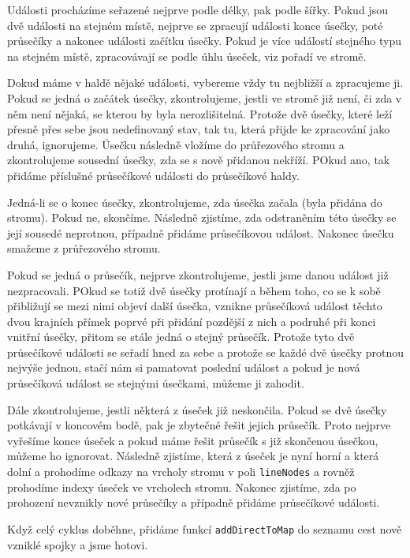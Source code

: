 Události procházíme seřazené nejprve podle délky, pak podle šířky. Pokud jsou
dvě události na stejném místě, nejprve se zpracují události konce úsečky, poté
průsečíky a nakonec události začítku úsečky. Pokud je více událostí stejného
typu na stejném místě, zpracovávají se podle úhlu úseček, viz pořadí ve stromě. 

Dokud máme v haldě nějaké události, vybereme vždy tu nejbližší a zpracujeme ji.
Pokud se jedná o začátek úsečky, zkontrolujeme, jestli ve stromě již není, či
zda v něm není nějaká, se kterou by byla nerozlišitelná. Protože dvě úsečky,
které leží přesně přes sebe jsou nedefinovaný stav, tak tu, která přijde ke
zpracování jako druhá, ignorujeme. Úsečku následně vložíme do průřezového stromu
a zkontrolujeme sousední úsečky, zda se s nově přidanou nekříží. POkud ano, tak
přidáme příslušné průsečíkové události do průsečíkové haldy.

Jedná-li se o konec úsečky, zkontrolujeme, zda úsečka začala (byla přidána do
stromu). Pokud ne, skončíme. Následně zjistíme, zda odstraněním této úsečky se
její sousedé neprotnou, případně přidáme průsečíkovou událost. Nakonec úsečku
smažeme z průřezového stromu.

Pokud se jedná o průsečík, nejprve zkontrolujeme, jestli jsme danou událost již
nezpracovali. POkud se totiž dvě úsečky protínají a během toho, co se k sobě
přibližují se mezi nimi objeví další úsečka, vznikne průsečíková událost těchto
dvou krajních přímek poprvé při přidání pozdější z nich a podruhé při konci
vnitřní úsečky, přitom se stále jedná o stejný průsečík. Protože tyto dvě
průsečíkové události se seřadí hned za sebe a protože se každé dvě úsečky
protnou nejvýše jednou, stačí nám si pamatovat poslední událost a pokud je nová
průsečíková událost se stejnými úsečkami, můžeme ji zahodit.

Dále zkontrolujeme, jestli některá z úseček již neskončila. Pokud se dvě úsečky
potkávají v koncovém bodě, pak je zbytečné řešit jejich průsečík. Proto nejprve
vyřešíme konce úseček a pokud máme řešit průsečík s již skončenou úsečkou,
můžeme ho ignorovat. Následně zjistíme, která z úseček je nyní horní a která
dolní a prohodíme odkazy na vrcholy stromu v poli \verb|lineNodes| a rovněž
prohodíme indexy úseček ve vrcholech stromu. Nakonec zjistíme, zda po prohození
nevznikly nové průsečíky a případně přidáme průsečíkové události.

Když celý cyklus doběhne, přidáme funkcí \verb|addDirectToMap| do seznamu cest
nově vzniklé spojky a jsme hotovi.


